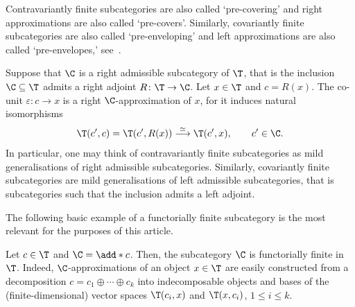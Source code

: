 \documentclass[a4paper]{amsart}
\begin{document}
\begin{remark}
  Contravariantly finite subcategories are also called `pre-covering' and right
  approximations are also called `pre-covers'. Similarly, covariantly finite
  subcategories are also called `pre-enveloping' and left approximations are
  also called `pre-envelopes,' see~\cite{Eno81}.
\end{remark}

\begin{example}
  Suppose that $\C$ is a right admissible subcategory of $\T$, that is the
  inclusion $\C\subseteq\T$ admits a right adjoint $R\colon\T\to\C$. Let
  $x\in\T$ and $c=R(x)$. The co-unit $\varepsilon\colon c\to x$ is a right
  $\C$-approximation of $x$, for it induces natural isomorphisms
  \[
    \T(c',c)=\T(c',R(x))\stackrel{\simeq}{\longrightarrow}\T(c',x),\qquad
    c'\in\C.
  \]
  In particular, one may think of contravariantly finite subcategories as mild
  generalisations of right admissible subcategories. Similarly, covariantly
  finite subcategories are mild generalisations of left admissible
  subcategories, that is subcategories such that the inclusion admits a left
  adjoint.
\end{example}

The following basic example of a functorially finite subcategory is the most
relevant for the purposes of this article.

\begin{example}
  Let $c\in\T$ and $\C=\add*{c}$. Then, the subcategory $\C$ is functorially
  finite in $\T$. Indeed, $\C$-approximations of an object $x\in\T$ are easily
  constructed from a decomposition $c=c_1\oplus\cdots\oplus c_k$ into
  indecomposable objects and bases of the (finite-dimensional) vector spaces
  $\T(c_i,x)$ and $\T(x,c_i)$, $1\leq i\leq k$.
\end{example}
\end{document}
